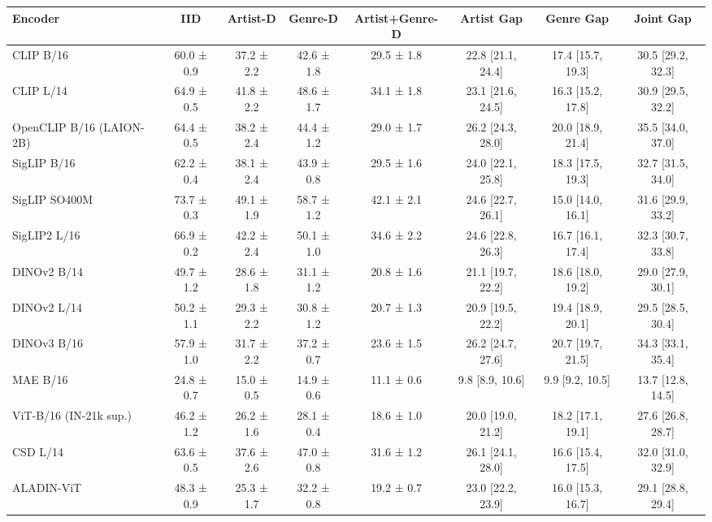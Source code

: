 \begin{tabular}{lccccccc}
\toprule
Encoder & IID & Artist-D & Genre-D & Artist+Genre-D & Artist Gap & Genre Gap & Joint Gap \\
\midrule
CLIP B/16 & 60.0 ± 0.9 & 37.2 ± 2.2 & 42.6 ± 1.8 & 29.5 ± 1.8 & 22.8 [21.1, 24.4] & 17.4 [15.7, 19.3] & 30.5 [29.2, 32.3] \\
CLIP L/14 & 64.9 ± 0.5 & 41.8 ± 2.2 & 48.6 ± 1.7 & 34.1 ± 1.8 & 23.1 [21.6, 24.5] & 16.3 [15.2, 17.8] & 30.9 [29.5, 32.2] \\
OpenCLIP B/16 (LAION-2B) & 64.4 ± 0.5 & 38.2 ± 2.4 & 44.4 ± 1.2 & 29.0 ± 1.7 & 26.2 [24.3, 28.0] & 20.0 [18.9, 21.4] & 35.5 [34.0, 37.0] \\
SigLIP B/16 & 62.2 ± 0.4 & 38.1 ± 2.4 & 43.9 ± 0.8 & 29.5 ± 1.6 & 24.0 [22.1, 25.8] & 18.3 [17.5, 19.3] & 32.7 [31.5, 34.0] \\
SigLIP SO400M & 73.7 ± 0.3 & 49.1 ± 1.9 & 58.7 ± 1.2 & 42.1 ± 2.1 & 24.6 [22.7, 26.1] & 15.0 [14.0, 16.1] & 31.6 [29.9, 33.2] \\
SigLIP2 L/16 & 66.9 ± 0.2 & 42.2 ± 2.4 & 50.1 ± 1.0 & 34.6 ± 2.2 & 24.6 [22.8, 26.3] & 16.7 [16.1, 17.4] & 32.3 [30.7, 33.8] \\
DINOv2 B/14 & 49.7 ± 1.2 & 28.6 ± 1.8 & 31.1 ± 1.2 & 20.8 ± 1.6 & 21.1 [19.7, 22.2] & 18.6 [18.0, 19.2] & 29.0 [27.9, 30.1] \\
DINOv2 L/14 & 50.2 ± 1.1 & 29.3 ± 2.2 & 30.8 ± 1.2 & 20.7 ± 1.3 & 20.9 [19.5, 22.2] & 19.4 [18.9, 20.1] & 29.5 [28.5, 30.4] \\
DINOv3 B/16 & 57.9 ± 1.0 & 31.7 ± 2.2 & 37.2 ± 0.7 & 23.6 ± 1.5 & 26.2 [24.7, 27.6] & 20.7 [19.7, 21.5] & 34.3 [33.1, 35.4] \\
MAE B/16 & 24.8 ± 0.7 & 15.0 ± 0.5 & 14.9 ± 0.6 & 11.1 ± 0.6 & 9.8 [8.9, 10.6] & 9.9 [9.2, 10.5] & 13.7 [12.8, 14.5] \\
ViT-B/16 (IN-21k sup.) & 46.2 ± 1.2 & 26.2 ± 1.6 & 28.1 ± 0.4 & 18.6 ± 1.0 & 20.0 [19.0, 21.2] & 18.2 [17.1, 19.1] & 27.6 [26.8, 28.7] \\
CSD L/14 & 63.6 ± 0.5 & 37.6 ± 2.6 & 47.0 ± 0.8 & 31.6 ± 1.2 & 26.1 [24.1, 28.0] & 16.6 [15.4, 17.5] & 32.0 [31.0, 32.9] \\
ALADIN-ViT & 48.3 ± 0.9 & 25.3 ± 1.7 & 32.2 ± 0.8 & 19.2 ± 0.7 & 23.0 [22.2, 23.9] & 16.0 [15.3, 16.7] & 29.1 [28.8, 29.4] \\
\bottomrule
\end{tabular}
